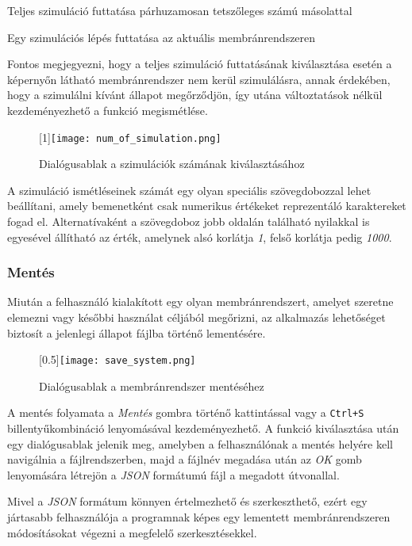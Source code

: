\begin{compactenum}
\item Teljes szimuláció futtatása párhuzamosan tetszőleges számú másolattal 
\item Egy szimulációs lépés futtatása az aktuális membránrendszeren
\end{compactenum}

Fontos megjegyezni, hogy a teljes szimuláció futtatásának kiválasztása esetén a képernyőn látható membránrendszer nem kerül szimulálásra, annak érdekében, hogy a szimulálni kívánt állapot megőrződjön, így utána változtatások nélkül kezdeményezhető a funkció megismétlése.

\begin{figure}[H]
	\centering
	\scalebox{1}[1]{\texttt{[image: num\_of\_simulation.png]}}
	\caption{Dialógusablak a szimulációk számának kiválasztásához}
	\label{fig:num_of_sim}
\end{figure}

A szimuláció ismétléseinek számát egy olyan speciális szövegdobozzal lehet beállítani, amely bemenetként csak numerikus értékeket reprezentáló karaktereket fogad el. Alternatívaként a szövegdoboz jobb oldalán található nyilakkal is egyesével állítható az érték, amelynek alsó korlátja \textit{1}, felső korlátja pedig \textit{1000}.
 
\subsubsection{Mentés}
Miután a felhasználó kialakított egy olyan membránrendszert, amelyet szeretne elemezni vagy későbbi használat céljából megőrizni, az alkalmazás lehetőséget biztosít a jelenlegi állapot fájlba történő lementésére.

\begin{figure}[H]
	\centering
	\scalebox{0.5}[0.5]{\texttt{[image: save\_system.png]}}
	\caption{Dialógusablak a membránrendszer mentéséhez}
	\label{fig:save_system}
\end{figure}

A mentés folyamata a \textit{Mentés} gombra történő kattintással vagy a \verb|Ctrl+S| billentyűkombináció lenyomásával kezdeményezhető. A funkció kiválasztása után egy dialógusablak jelenik meg, amelyben a felhasználónak a mentés helyére kell navigálnia a fájlrendszerben, majd a fájlnév megadása után az \textit{OK} gomb lenyomására létrejön a \textit{JSON} formátumú fájl a megadott útvonallal.

Mivel a \textit{JSON} formátum könnyen értelmezhető és szerkeszthető, ezért egy jártasabb felhasználója a programnak képes egy lementett membránrendszeren módosításokat végezni a megfelelő szerkesztésekkel. 


